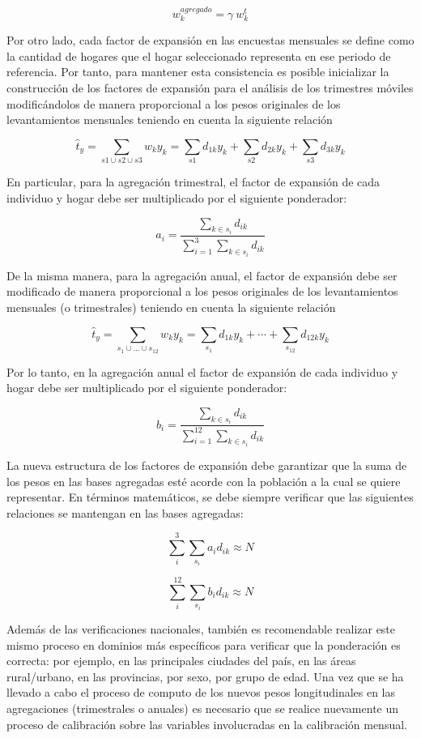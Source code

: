 \documentclass[
  10pt,
  spanish,
]{book}
\begin{document}
\[w_k^{agregado} = \gamma \  w_k^{t}\]

Por otro lado, cada factor de expansión en las encuestas mensuales se
define como la cantidad de hogares que el hogar seleccionado representa
en ese periodo de referencia. Por tanto, para mantener esta consistencia
es posible inicializar la construcción de los factores de expansión para
el análisis de los trimestres móviles modificándolos de manera
proporcional a los pesos originales de los levantamientos mensuales
teniendo en cuenta la siguiente relación

\[
\hat{t}_y = \sum_{s1 \cup s2 \cup s3} w_k y_k
= \sum_{s1} d_{1k} y_k + \sum_{s2} d_{2k} y_k + \sum_{s3} d_{3k} y_k
\]

En particular, para la agregación trimestral, el factor de expansión de
cada individuo y hogar debe ser multiplicado por el siguiente
ponderador:

\[
a_i = \frac{\sum_{k\in s_i}d_{ik}}{\sum_{i=1}^{3}\sum_{k\in s_i}d_{ik}}
\]

De la misma manera, para la agregación anual, el factor de expansión
debe ser modificado de manera proporcional a los pesos originales de los
levantamientos mensuales (o trimestrales) teniendo en cuenta la
siguiente relación

\[
\hat{t}_y = \sum_{s_1 \cup ... \cup s_{12}} w_k y_k
= \sum_{s_1} d_{1k} y_k + \cdots + \sum_{s_{12}} d_{12k} y_k
\]

Por lo tanto, en la agregación anual el factor de expansión de cada
individuo y hogar debe ser multiplicado por el siguiente ponderador:

\[
b_i = \frac{\sum_{k\in s_i}d_{ik}}{\sum_{i=1}^{12}\sum_{k\in s_i}d_{ik}}
\]

La nueva estructura de los factores de expansión debe garantizar que la
suma de los pesos en las bases agregadas esté acorde con la población a
la cual se quiere representar. En términos matemáticos, se debe siempre
verificar que las siguientes relaciones se mantengan en las bases
agregadas:

\[
\sum_{i}^{3}\sum_{s_i} a_i d_{ik} \approx N
\]

\[
\sum_{i}^{12}\sum_{s_i} b_i d_{ik} \approx N
\]

Además de las verificaciones nacionales, también es recomendable
realizar este mismo proceso en dominios más específicos para verificar
que la ponderación es correcta: por ejemplo, en las principales ciudades
del país, en las áreas rural/urbano, en las provincias, por sexo, por
grupo de edad. Una vez que se ha llevado a cabo el proceso de computo de
los nuevos pesos longitudinales en las agregaciones (trimestrales o
anuales) es necesario que se realice nuevamente un proceso de
calibración sobre las variables involucradas en la calibración mensual.
\end{document}
